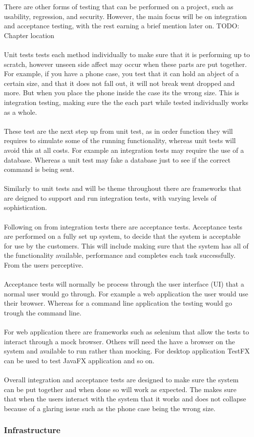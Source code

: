 There are other forms of testing that can be performed on a project, such as usability, regression,  and security. However, the main focus will be on integration and acceptance testing, with the rest earning a brief mention later on. TODO: Chapter location
\\\\
Unit tests tests each method individually to make sure that it is performing up to scratch, however unseen side affect may occur when these parts are put together. For example, if you have a phone case, you test that it can hold an abject of a certain size, and that it does not fall out, it will not break went dropped and more. But when you place the phone inside the case its the wrong size. This is integration testing, making sure the the each part while tested individually works as a whole.
\\\\
These test are the next step up from unit test, as in order function they will requires to simulate some of the running functionality, whereas unit tests will avoid this at all costs. For example an integration tests may require the use of a database. Whereas a unit test may fake a database just to see if the correct command is being sent.
\\\\ 
Similarly to unit tests and will be theme throughout there are frameworks that are deigned to support and run integration tests, with varying levels of sophistication.
\\\\
Following on from integration tests there are acceptance tests. Acceptance tests are performed on a fully set up system, to decide that the system is acceptable for use by the customers. This will include making sure that the system has all of the functionality available, performance and completes each task successfully. From the users perceptive.
\\\\
Acceptance tests will normally be process through the user interface (UI) that a normal user would go through. For example a web application the user would use their browser. Whereas for a command line application the testing would go trough the command line.
\\\\
For web application there are frameworks such as selenium that allow the tests to interact through a mock browser. Others will need the have a browser on the system and available to run rather than mocking. For desktop application TestFX can be used to test JavaFX application and so on.
\\\\
Overall integration and acceptance tests are designed to make sure the system can be put together and when done so will work as expected. The makes sure that when the users interact with the system that it works and does not collapse because of a glaring issue such as the phone case being the wrong size.

\subsubsection{Infrastructure}